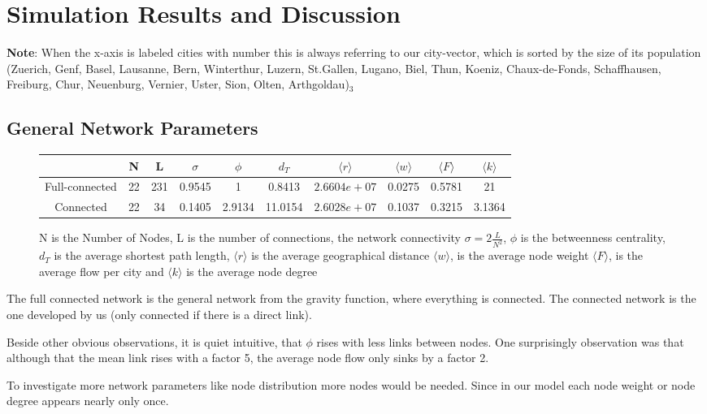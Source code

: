 \documentclass[11pt]{article}
\begin{document}
\section{Simulation Results and Discussion}
\textbf{Note}: When the x-axis is labeled cities with number this is always referring to our city-vector, which is sorted by the size of its population (Zuerich, Genf, Basel, Lausanne, Bern, Winterthur, Luzern, St.Gallen, Lugano, Biel, Thun, Koeniz, Chaux-de-Fonds, Schaffhausen, Freiburg, Chur, Neuenburg, Vernier, Uster, Sion, Olten, Arthgoldau)$_{3}$


\subsection{General Network Parameters}
\begin{figure}[h]
\begin{tabular}{c|c|c|c|c|c|c|c|c|c|}
 & N & L & $\sigma$ & $\phi$ & $d_T$ & $\langle r\rangle$ & 
 $\langle w\rangle$ & $\langle F\rangle$&$\langle k\rangle$ \\\hline
 Full-connected & 22 & 231 &0.9545&1& 0.8413& $2.6604e+07$&0.0275&0.5781& 21\\\hline
 
 Connected & 22 & 34 &    0.1405&2.9134& 11.0154&$2.6028e+07$&0.1037&0.3215& 3.1364\\\hline
\end{tabular}
\caption{N is the Number of Nodes, L is the number of connections, the network connectivity $\sigma=2\frac{L}{N^2}$, $\phi$ is the betweenness centrality, $d_T$ is the average shortest path length,  $\langle r\rangle$ is the average geographical distance  
 $\langle w\rangle$, is the average node weight $\langle F\rangle$, is the average flow per city and $\langle k\rangle$ is the average node degree}
\end{figure}

The full connected network is the general network from the gravity function, where everything is connected. The connected network is the one developed by us (only connected if there is a direct link).

Beside other obvious observations, it is quiet intuitive, that $\phi$ rises with less links between nodes. One surprisingly observation was that although that the mean link rises with a factor 5, the average node flow only sinks by a factor 2.\newline

To investigate more network parameters like node distribution more nodes would be needed. Since in our model each node weight or node degree appears nearly only once.
\end{document}
